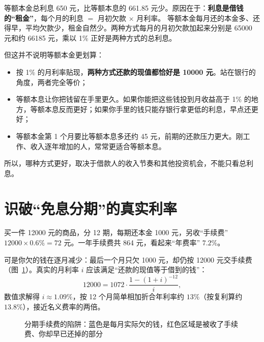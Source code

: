 等额本金总利息 650 元，比等额本息的 661.85 元少。原因在于：\textbf{利息是借钱的“租金”}，每个月的利息 $=$ 月初欠款 $\times$ 月利率。
等额本金每月还的本金多、还得早，平均欠款少，租金自然少。两种方式每月的月初欠款加起来分别是 65000 元和约 66185 元，乘以 1\% 正好是两种方式的总利息。

但这并不说明等额本金更划算：
\begin{itemize}
  \item 按 1\% 的月利率贴现，\textbf{两种方式还款的现值都恰好是 10000 元}。站在银行的角度，两者完全等价；
  \item 等额本息让你把钱留在手里更久。如果你能把这些钱投到月收益高于 1\% 的地方，等额本息反而更好；如果你手里的钱只能存银行拿更低的利息，早点还更好；
  \item 等额本金第 1 个月要比等额本息多还约 45 元，前期的还款压力更大。刚工作、收入逐年增加的人，常常更适合等额本息。
\end{itemize}
所以，哪种方式更好，取决于借款人的收入节奏和其他投资机会，不能只看总利息。

\section{识破“免息分期”的真实利率}

买一件 12000 元的商品，分 12 期，每期还本金 1000 元，另收“手续费” $12000\times0.6\%=72$ 元。一年手续费共 864 元，看起来“年费率” $7.2\%$。

可是你欠的钱在逐月减少：最后一个月只欠 1000 元，却仍按 12000 元交手续费（图~\ref{fig:es-fee}）。真实的月利率 $i$ 应该满足“还款的现值等于借到的钱”：
\[
  12000=1072\cdot\frac{1-(1+i)^{-12}}{i},
\]
数值求解得 $i\approx1.09\%$，按 12 个月简单相加折合年利率约 $13\%$（按复利算约 $13.8\%$），接近名义费率的两倍。

\begin{figure}[!htbp]
\centering
{}
\caption{分期手续费的陷阱：蓝色是每月实际欠的钱，红色区域是被收了手续费、你却早已还掉的部分}
\label{fig:es-fee}
\end{figure}

